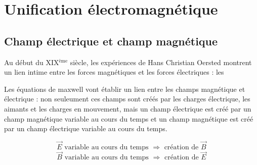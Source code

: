 
\section{Unification électromagnétique}
%

\subsection{Champ électrique et champ magnétique}

Au début du XIX$^\text{ème}$ siècle, les expériences de Hans Christian Oersted montrent un lien intime entre les forces magnétiques et les forces électriques : les 

Les équations de maxwell vont établir un lien entre les champs magnétique et électrique : non seuleument ces champs sont créés par les charges électrique, les aimants et les charges en mouvement, mais un champ électrique est créé par un champ magnétique variable au cours du temps et un champ magnétique est créé par un champ électrique variable au cours du temps.

\[
\overrightarrow{E} \text{ variable au cours du temps } \Rightarrow \text{ création de } \overrightarrow{B}
\]
\[
\overrightarrow{B} \text{ variable au cours du temps } \Rightarrow \text{ création de } \overrightarrow{E}
\]



